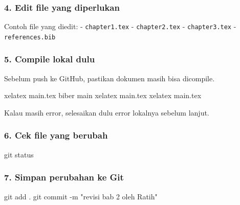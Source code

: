 \documentclass[
]{article}
\newenvironment{Shaded}{}{}
\newcommand{\AttributeTok}[1]{\textcolor[rgb]{0.49,0.56,0.16}{#1}}
\newcommand{\ExtensionTok}[1]{#1}
\newcommand{\FunctionTok}[1]{\textcolor[rgb]{0.02,0.16,0.49}{#1}}
\newcommand{\NormalTok}[1]{#1}
\newcommand{\StringTok}[1]{\textcolor[rgb]{0.25,0.44,0.63}{#1}}
\begin{document}
\subsubsection{4. Edit file yang
diperlukan}\label{edit-file-yang-diperlukan}

Contoh file yang diedit: - \texttt{chapter1.tex} - \texttt{chapter2.tex}
- \texttt{chapter3.tex} - \texttt{references.bib}

\subsubsection{5. Compile lokal dulu}\label{compile-lokal-dulu}

Sebelum push ke GitHub, pastikan dokumen masih bisa dicompile.

\begin{Shaded}
\begin{Highlighting}[]
\ExtensionTok{xelatex}\NormalTok{ main.tex}
\ExtensionTok{biber}\NormalTok{ main}
\ExtensionTok{xelatex}\NormalTok{ main.tex}
\ExtensionTok{xelatex}\NormalTok{ main.tex}
\end{Highlighting}
\end{Shaded}

Kalau masih error, selesaikan dulu error lokalnya sebelum lanjut.

\subsubsection{6. Cek file yang berubah}\label{cek-file-yang-berubah}

\begin{Shaded}
\begin{Highlighting}[]
\FunctionTok{git}\NormalTok{ status}
\end{Highlighting}
\end{Shaded}

\subsubsection{7. Simpan perubahan ke
Git}\label{simpan-perubahan-ke-git}

\begin{Shaded}
\begin{Highlighting}[]
\FunctionTok{git}\NormalTok{ add .}
\FunctionTok{git}\NormalTok{ commit }\AttributeTok{{-}m} \StringTok{"revisi bab 2 oleh Ratih"}
\end{Highlighting}
\end{Shaded}
\end{document}
